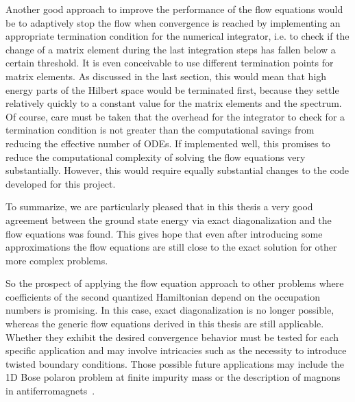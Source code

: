 Another good approach to improve the performance of the flow equations would be to adaptively stop the flow when convergence is reached by implementing an appropriate termination condition for the numerical integrator, i.e. to check if the change of a matrix element during the last integration steps has fallen below a certain threshold. It is even conceivable to use different termination points for matrix elements. As discussed in the last section, this would mean that high energy parts of the Hilbert space would be terminated first, because they settle relatively quickly to a constant value for the matrix elements and the spectrum. Of course, care must be taken that the overhead for the integrator to check for a termination condition is not greater than the computational savings from reducing the effective number of ODEs. If implemented well, this promises to reduce the computational complexity of solving the flow equations very substantially. However, this would require equally substantial changes to the code developed for this project. \par
To summarize, we are particularly pleased that in this thesis a very good agreement between the ground state energy via exact diagonalization and the flow equations was found. This gives hope that even after introducing some approximations the flow equations are still close to the exact solution for other more complex problems.\par
So the prospect of applying the flow equation approach to other problems where coefficients of the second quantized Hamiltonian depend on the occupation numbers is promising. In this case, exact diagonalization is no longer possible, whereas the generic flow equations derived in this thesis are still applicable. Whether they exhibit the desired convergence behavior must be tested for each specific application and may involve intricacies such as the necessity to introduce twisted boundary conditions. 
Those possible future applications may include the 1D Bose polaron problem at finite impurity mass or the description of magnons in \mbox{antiferromagnets \cite{Bermes_2023}}.
